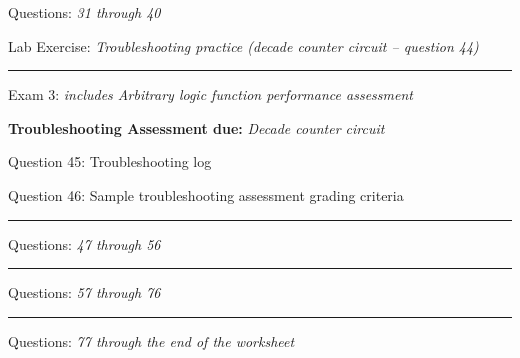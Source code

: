 \hskip 10pt Questions: {\it 31 through 40}
 
\hskip 10pt Lab Exercise: {\it Troubleshooting practice (decade counter circuit -- question 44)}
 
\vskip 10pt
\hrule \vskip 5pt
\noindent
{}

\hskip 10pt Exam 3: {\it includes Arbitrary logic function performance assessment}
 
\hskip 10pt {\bf Troubleshooting Assessment due:} {\it Decade counter circuit}
 
\hskip 10pt Question 45: Troubleshooting log
 
\hskip 10pt Question 46: Sample troubleshooting assessment grading criteria
 
\vskip 10pt
\hrule \vskip 5pt
\noindent
{}

\hskip 10pt Questions: {\it 47 through 56}
 
\vskip 10pt
\hrule \vskip 5pt
\noindent
{}

\hskip 10pt Questions: {\it 57 through 76}
 
\vskip 10pt
\hrule \vskip 5pt
\noindent
{}

\hskip 10pt Questions: {\it 77 through the end of the worksheet}
 











\vfil \eject
\bye
